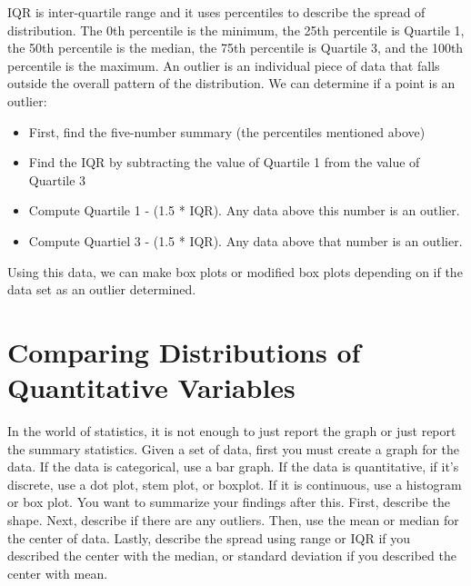 \documentclass[../stats.tex]{subfiles}
\begin{document}
IQR is inter-quartile range and it uses percentiles to describe the spread of distribution. The 0th percentile is the minimum, the 25th percentile is Quartile 1, the 50th percentile is the median, the 75th percentile is Quartile 3, and the 100th percentile is the maximum.
\smallbreak
An outlier is an individual piece of data that falls outside the overall pattern of the distribution. We can determine if a point is an outlier:
\begin{itemize}
    \item First, find the five-number summary (the percentiles mentioned above)
    \item Find the IQR by subtracting the value of Quartile 1 from the value of Quartile 3
    \item Compute Quartile 1 - (1.5 * IQR). Any data above this number is an outlier.
    \item Compute Quartiel 3 - (1.5 * IQR). Any data above that number is an outlier. 
\end{itemize}
Using this data, we can make box plots or modified box plots depending on if the data set as an outlier determined.
\section{Comparing Distributions of Quantitative Variables}
In the world of statistics, it is not enough to just report the graph or just report the summary statistics.
\smallbreak
Given a set of data, first you must create a graph for the data. If the data is categorical, use a bar graph. If the data is quantitative, if it's discrete, use a dot plot, stem plot, or boxplot. If it is continuous, use a histogram or box plot. 
\smallbreak
You want to summarize your findings after this. First, describe the shape. Next, describe if there are any outliers. Then, use the mean or median for the center of data. Lastly, describe the spread using range or IQR if you described the center with the median, or standard deviation if you described the center with mean. 
\end{document}
